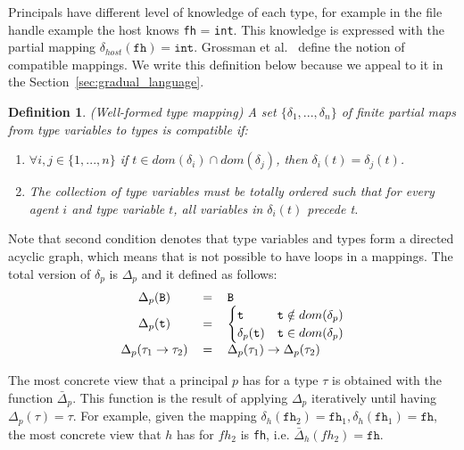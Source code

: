 \documentclass{article}
\newcommand\icode[1]{\texttt{#1}}
\newtheorem{definition}{Definition}[section]
\begin{document}
	Principals have different level of knowledge of each type, for example in the file handle example the {\sf host} knows \icode{fh} = \icode{int}. This knowledge is expressed with the partial mapping $\delta_{host}(\icode{fh}) = \icode{int}$. Grossman et al.~\cite{grossmanAl:toplas2000} define the notion of compatible mappings. We write this definition below because we appeal to it in the Section~\ref{sec:gradual_language}.
	\begin{definition}{(Well-formed type mapping)}
	\label{def:well-formed-mapping}
	A set $\{\delta_1,..., \delta_n\}$ of finite partial maps from type variables to types is compatible if:
	\begin{enumerate}
	\item{$\forall i,j \in \{1,...,n\}$ if $t \in dom(\delta_i) \cap dom(\delta_j)$, then $\delta_i(t)=\delta_j(t)$.}
	\item{The collection of type variables must be totally ordered such that for every agent $i$ and type variable $t$, all variables in $\delta_i(t)$ precede t.}
	\end{enumerate}
	\end{definition}
Note that second condition denotes that type variables and types form a directed acyclic graph, which means that is not possible to have loops in a mappings.  
The total version of $\delta_p$ is $\Delta_p$ and it defined as follows:
	\[
	\begin{tabular}{c c l}
		$\Delta_p(\texttt{B})$ & $=$ & $\texttt{B}$ \\
		$\Delta_p(\texttt{t})$ & = & $
		\begin{cases} 
      \texttt{t} & \texttt{t} \notin dom(\delta_p) \\      
      \delta_p(\texttt{t}) &  \texttt{t} \in dom(\delta_p)
   \end{cases} $\\
		
		$\Delta_p(\tau_1 \rightarrow \tau_2)$ & = & $\Delta_p(\tau_1) \rightarrow \Delta_p(\tau_2)$
	\end{tabular}
	\]

The most concrete view that a principal $p$ has for a type $\tau$ is obtained with the function $\bar{\Delta}_p$. This function is the result of applying $\Delta_p$ iteratively until having $\Delta_p(\tau)= \tau$. For example, given the mapping $\delta_{h}(\icode{fh}_2) = \icode{fh}_1, \delta_{h}(\icode{fh}_1) = \icode{fh}$, the most concrete view that $h$ has for $fh_2$ is \icode{fh}, i.e. $\bar{\Delta}_h(fh_2)=\icode{fh}$.
\end{document}
